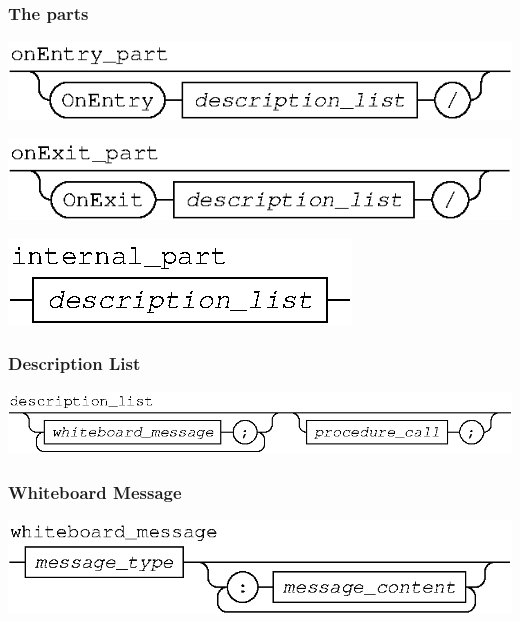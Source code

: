 \documentclass[11pt]{article}
\begin{document}
\subsubsection{The parts }

\begin{center}
\includegraphics{onEntry_part}
\end{center}
\begin{center}
\includegraphics{onExit_part}
\end{center}
\begin{center}
\includegraphics{internal_part}
\end{center}

%
\subsubsection{Description List}

\begin{center}
\includegraphics{description_list}
\end{center}

%
\subsubsection{Whiteboard Message}

\begin{center}
\includegraphics{whiteboard_message}
\end{center}
\end{document}
